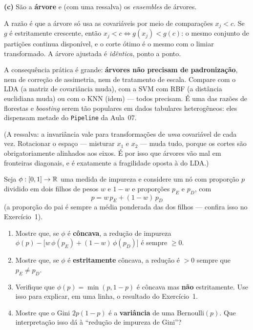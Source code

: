 \documentclass[11pt,a4paper]{article}
\begin{document}
\begin{solucao}
\smallskip
\textbf{(c)} São a \textbf{árvore} e (com uma ressalva) os \emph{ensembles} de
árvores.

A razão é que a árvore só usa as covariáveis por meio de comparações
$x_j < c$. Se $g$ é estritamente crescente, então $x_j < c \iff g(x_j) < g(c)$:
o mesmo conjunto de partições continua disponível, e o corte ótimo é o mesmo com
o limiar transformado. A árvore ajustada é \emph{idêntica}, ponto a ponto.

A consequência prática é grande: \textbf{árvores não precisam de padronização},
nem de correção de assimetria, nem de tratamento de escala. Compare com o LDA (a
matriz de covariância muda), com a SVM com RBF (a distância euclidiana muda) ou
com o KNN (idem) --- todos precisam. É uma das razões de florestas e
\emph{boosting} serem tão populares em dados tabulares heterogêneos: eles
dispensam metade do \texttt{Pipeline} da Aula~07.

(A ressalva: a invariância vale para transformações de \emph{uma} covariável de
cada vez. Rotacionar o espaço --- misturar $x_1$ e $x_2$ --- muda tudo, porque os
cortes são obrigatoriamente alinhados aos eixos. É por isso que árvores vão mal
em fronteiras diagonais, e é exatamente a fragilidade oposta à do LDA.)
\end{solucao}

\begin{exercicio}
Seja $\phi:[0,1]\to\mathbb{R}$ uma medida de impureza e considere um nó com proporção
$p$ dividido em dois filhos de pesos $w$ e $1-w$ e proporções $p_E$ e $p_D$, com
\[
  p = w\,p_E + (1-w)\,p_D
\]
(a proporção do pai é sempre a média ponderada das dos filhos --- confira isso no
Exercício~1).
\begin{enumerate}[label=(\alph*),leftmargin=1.1cm]
  \item Mostre que, se $\phi$ é \textbf{côncava}, a redução de impureza
        $\phi(p) - \big[w\,\phi(p_E) + (1-w)\,\phi(p_D)\big]$ é sempre $\ge 0$.
  \item Mostre que, se $\phi$ é \textbf{estritamente} côncava, a redução é
        $>0$ sempre que $p_E \neq p_D$.
  \item Verifique que $\phi(p)=\min(p,1-p)$ é côncava mas \textbf{não}
        estritamente. Use isso para explicar, em uma linha, o resultado do
        Exercício~1.
  \item Mostre que o Gini $2p(1-p)$ é a \textbf{variância} de uma Bernoulli$(p)$.
        Que interpretação isso dá à ``redução de impureza de Gini''?
\end{enumerate}
\end{exercicio}
\end{document}
